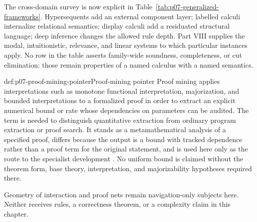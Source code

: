 The cross-domain survey is now explicit in
Table~\ref{tab:p07-generalized-frameworks}. Hypersequents add an external
component layer; labelled calculi internalize relational semantics; display
calculi add a residuated structural language; deep inference changes the
allowed rule depth. Part VIII supplies the modal, intuitionistic, relevance,
and linear systems to which particular instances apply. No row in the table
asserts family-wide soundness, completeness, or cut elimination: those remain
properties of a named calculus with a named semantics.

\begin{proofboundary}{def:p07-proof-mining-pointer}{Proof-mining pointer}
Proof mining applies interpretations such as monotone functional
interpretation, majorization, and bounded interpretations to a formalized proof
in order to extract an explicit numerical bound or rate whose dependencies on
parameters can be audited. The term is needed to distinguish quantitative
extraction from ordinary program extraction or proof search. It stands as a
metamathematical analysis of a specified proof, differs because the output is
a bound with tracked dependence rather than a proof term for the original
statement, and is used here only as the route to the specialist development
\cite{Kohlenbach2008}. No uniform bound is claimed without the theorem form,
base theory, interpretation, and majorizability hypotheses required there.
\end{proofboundary}

Geometry of interaction and proof nets remain navigation-only subjects here.
Neither receives rules, a correctness theorem, or a complexity claim in this
chapter.
